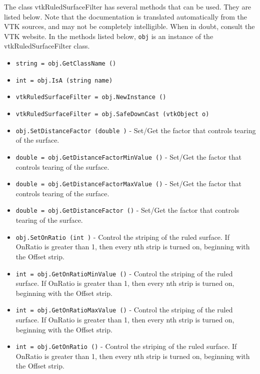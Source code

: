 The class vtkRuledSurfaceFilter has several methods that can be used.
  They are listed below.
Note that the documentation is translated automatically from the VTK sources,
and may not be completely intelligible.  When in doubt, consult the VTK website.
In the methods listed below, \verb|obj| is an instance of the vtkRuledSurfaceFilter class.
\begin{itemize}
\item  \verb|string = obj.GetClassName ()|

\item  \verb|int = obj.IsA (string name)|

\item  \verb|vtkRuledSurfaceFilter = obj.NewInstance ()|

\item  \verb|vtkRuledSurfaceFilter = obj.SafeDownCast (vtkObject o)|

\item  \verb|obj.SetDistanceFactor (double )| -  Set/Get the factor that controls tearing of the surface.

\item  \verb|double = obj.GetDistanceFactorMinValue ()| -  Set/Get the factor that controls tearing of the surface.

\item  \verb|double = obj.GetDistanceFactorMaxValue ()| -  Set/Get the factor that controls tearing of the surface.

\item  \verb|double = obj.GetDistanceFactor ()| -  Set/Get the factor that controls tearing of the surface.

\item  \verb|obj.SetOnRatio (int )| -  Control the striping of the ruled surface. If OnRatio is greater 
 than 1, then every nth strip is turned on, beginning with the Offset
 strip.

\item  \verb|int = obj.GetOnRatioMinValue ()| -  Control the striping of the ruled surface. If OnRatio is greater 
 than 1, then every nth strip is turned on, beginning with the Offset
 strip.

\item  \verb|int = obj.GetOnRatioMaxValue ()| -  Control the striping of the ruled surface. If OnRatio is greater 
 than 1, then every nth strip is turned on, beginning with the Offset
 strip.

\item  \verb|int = obj.GetOnRatio ()| -  Control the striping of the ruled surface. If OnRatio is greater 
 than 1, then every nth strip is turned on, beginning with the Offset
 strip.


\end{itemize}
